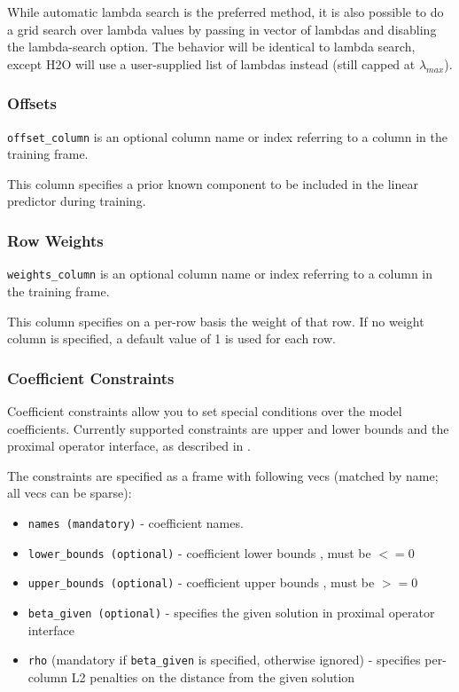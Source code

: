 While automatic lambda search is the preferred method, it is also possible to do a grid search over lambda values
by passing in vector of lambdas and disabling the lambda-search option. The behavior will be identical to lambda
search, except H2O will use a user-supplied list of lambdas instead (still capped at $\lambda_{max}$).

\bigskip
\waterExampleInR


\subsubsection{Offsets}

\texttt{offset\_column} is an optional column name or index referring to a column in the training frame.

This column specifies a prior known component to be included in the linear predictor during training.

\subsubsection{Row Weights}

\texttt{weights\_column} is an optional column name or index referring to a column in the training frame.

This column specifies on a per-row basis the weight of that row.  If no weight column is specified, a default value
of 1 is used for each row.

\subsubsection{Coefficient Constraints}

Coefficient constraints allow you to set special conditions over the model coefficients. Currently supported
constraints are upper and lower bounds and the proximal operator interface, as described in .

The constraints are specified as a frame with following vecs (matched by name; all vecs can be sparse):

\begin{itemize}
\item \texttt{names (mandatory)}  - coefficient names. 
\item \texttt{lower\_bounds (optional)} - coefficient lower bounds , must be $<= 0$
\item \texttt{upper\_bounds (optional)} - coefficient upper bounds , must be $>= 0$
\item \texttt{beta\_given (optional)} - specifies the given solution in proximal operator interface
\item \texttt{rho} (mandatory if \texttt{beta\_given} is specified, otherwise ignored) - specifies per-column L2 penalties on the distance from the given solution
\end{itemize}
 

